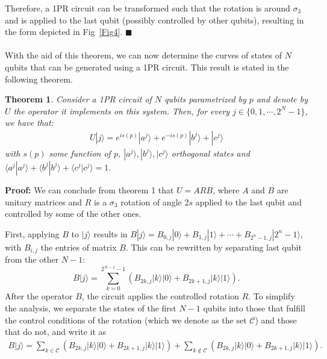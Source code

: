 \documentclass[10pt,letterpaper]{article} %
\newcommand{\fref}[1]{Fig~\ref{#1}}
\newtheorem{theorem}{Theorem}
\begin{document}
Therefore, a 1PR circuit can be transformed such
that the rotation is around $\sigma_3$ and is applied to the last qubit 
(possibly controlled by other qubits), 
resulting in the form depicted in \fref{Fig4}. 
$\blacksquare$ \\
$\;$\\

With the aid of this theorem, we can now determine the curves
of states of $N$ qubits that can be generated using a 1PR circuit. 
This result is stated in the following theorem.

\begin{theorem}
\label{theorem2}
Consider a 1PR circuit of $N$ qubits parametrized by $p$
and denote by $U$ the operator it implements on this system. 
Then, for every $j \in \{0, 1, \cdots, 2^N-1\}$, 
we have that:
\begin{align*}
U|j\rangle = e^{is(p)} |a^j\rangle + e^{-is(p)} |b^j\rangle + |c^j\rangle
\end{align*}
with $s(p)$ some function of $p$,  $|a^j\rangle ,|b^j\rangle, |c^j\rangle$ orthogonal states and $\langle a^j| a^j\rangle + \langle b^j| b^j\rangle + \langle
c^j|c^j \rangle = 1$.
\end{theorem}
\textbf{Proof:} 
We can conclude from theorem 1 that $U=ARB$,
where $A$ and $B$ are unitary matrices and $R$ is a $\sigma_3$ rotation of angle $2s$
applied to the last qubit and controlled by some of the other ones. 

First, applying $B$ to $|j\rangle$ results in $B|j\rangle = B_{0,j} |0\rangle + B_{1,j} |1 \rangle + \cdots + B_{2^n-1,j}|2^n-1\rangle$,
with $B_{i,j}$ the entries of matrix $B$.
This can be rewritten by separating last qubit from the other $N-1$:
\begin{equation}
B|j\rangle = \sum_{k=0}^{2^{N-1}-1} \left( B_{2k,j} |k\rangle|0\rangle  + B_{2k+1,j} |k \rangle |1\rangle  \right).
\end{equation}
After the operator $B$, the circuit applies the  controlled rotation $R$.
To simplify the analysis, we separate the states of
the first $N-1$ qubits into those that fulfill the control conditions of the rotation
(which we denote as the set $\mathcal{C}$)
and those that do not, and write it as
\begin{align}
B|j\rangle = 
   \sum_{k \in \mathcal{C}} \left( B_{2k,j} |k\rangle|0\rangle 
                                     + B_{2k+1,j} |k \rangle |1\rangle  \right) 
   + \sum_{k \not\in \mathcal{C}} \left( B_{2k,j} |k\rangle|0\rangle  
                                      + B_{2k+1,j} |k \rangle |1\rangle  \right).
\end{align}
\end{document}
